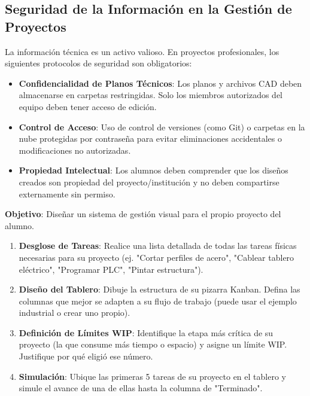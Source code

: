 \documentclass[../main]{subfiles}
\begin{document}
\subsection{Seguridad de la Información en la Gestión de Proyectos}
La información técnica es un activo valioso. En proyectos profesionales, los siguientes protocolos de seguridad son obligatorios:
\begin{itemize}
    \item \textbf{Confidencialidad de Planos Técnicos}: Los planos y archivos CAD deben almacenarse en carpetas restringidas. Solo los miembros autorizados del equipo deben tener acceso de edición.
    \item \textbf{Control de Acceso}: Uso de control de versiones (como Git) o carpetas en la nube protegidas por contraseña para evitar eliminaciones accidentales o modificaciones no autorizadas.
    \item \textbf{Propiedad Intelectual}: Los alumnos deben comprender que los diseños creados son propiedad del proyecto/institución y no deben compartirse externamente sin permiso.
\end{itemize}

\newpage
{}

\textbf{Objetivo}: Diseñar un sistema de gestión visual para el propio proyecto del alumno.

\begin{enumerate}
    \item \textbf{Desglose de Tareas}: Realice una lista detallada de todas las tareas físicas necesarias para su proyecto (ej. "Cortar perfiles de acero", "Cablear tablero eléctrico", "Programar PLC", "Pintar estructura").
    \item \textbf{Diseño del Tablero}: Dibuje la estructura de su pizarra Kanban. Defina las columnas que mejor se adapten a su flujo de trabajo (puede usar el ejemplo industrial o crear uno propio). 
    \item \textbf{Definición de Límites WIP}: Identifique la etapa más crítica de su proyecto (la que consume más tiempo o espacio) y asigne un límite WIP. Justifique por qué eligió ese número.
    \item \textbf{Simulación}: Ubique las primeras 5 tareas de su proyecto en el tablero y simule el avance de una de ellas hasta la columna de "Terminado".
\end{enumerate}
\end{document}
